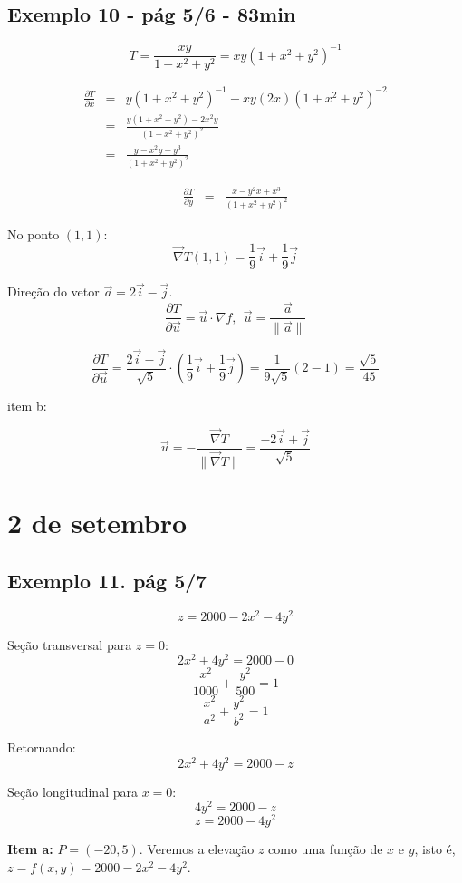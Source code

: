 \documentclass[a4paper,10pt]{book}
\begin{document}
\section{Exemplo 10 - pág 5/6 - 83min}

$$T = \frac{xy}{1+x^2+y^2}=xy(1+x^2+y^2)^{-1}$$

\begin{eqnarray*}
 \frac{\partial T}{\partial x}&=&y(1+x^2+y^2)^{-1}-xy(2x)(1+x^2+y^2)^{-2}\\
 &=&\frac{y(1+x^2+y^2)-2x^2y}{(1+x^2+y^2)^{2}}\\
 &=&\frac{y-x^2y+y^3}{(1+x^2+y^2)^{2}}
\end{eqnarray*}


\begin{eqnarray*}
 \frac{\partial T}{\partial y}
 &=&\frac{x-y^2x+x^3}{(1+x^2+y^2)^{2}}
\end{eqnarray*}

No ponto $(1,1)$:
$$\vec{\nabla}T (1,1) = \frac{1}{9}\vec{i}+\frac{1}{9}\vec{j}$$

Direção do vetor $\vec{a}=2\vec{i}-\vec{j}$.
$$\frac{\partial T}{\partial \vec{u}}=\vec{u}\cdot\nabla f,~~\vec{u}=\frac{\vec{a}}{\|\vec{a}\|}$$

$$\frac{\partial T}{\partial \vec{u}}=\frac{2\vec{i}-\vec{j}}{\sqrt{5}}\cdot\left(\frac{1}{9}\vec{i}+\frac{1}{9}\vec{j}\right)=\frac{1}{9\sqrt{5}}(2-1)=\frac{\sqrt{5}}{45}$$

item b:

$$\vec{u}=-\frac{\vec{\nabla}T}{\|\vec{\nabla}T\|}=\frac{-2\vec{i}+\vec{j}}{\sqrt{5}}$$

\chapter{2 de setembro}

\section{Exemplo 11. pág 5/7}
$$z=2000-2x^2-4y^2$$

Seção transversal para $z=0$:
$$2x^2+4y^2=2000-0$$
$$\frac{x^2}{1000}+\frac{y^2}{500}=1$$
$$\frac{x^2}{a^2}+\frac{y^2}{b^2}=1$$

Retornando:
$$2x^2+4y^2=2000-z$$

Seção longitudinal para $x=0$:
$$4y^2=2000-z$$
$$z=2000-4y^2$$

{\bf Item a:} $P=(-20,5)$.
Veremos a elevação $z$ como uma função de $x$ e $y$, isto é, $z=f(x,y)=2000-2x^2-4y^2$.
\end{document}
